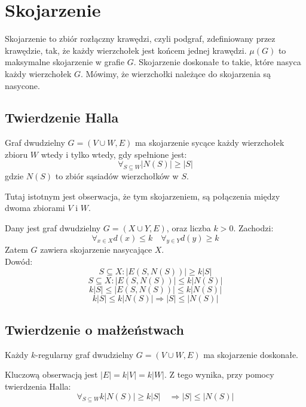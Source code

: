 \documentclass{../notatki}
\begin{document}
\section{Skojarzenie}

Skojarzenie to zbiór rozłączny krawędzi, czyli podgraf, zdefiniowany
przez krawędzie, tak, że każdy wierzchołek jest końcem jednej
krawędzi. $\mu(G)$ to maksymalne skojarzenie w grafie $G$.
Skojarzenie doskonałe to takie, które nasyca każdy wierzchołek $G$.
Mówimy, że wierzchołki należące do skojarzenia są nasycone.

\subsection{Twierdzenie Halla}

Graf dwudzielny $G = (V \cup W, E)$ ma skojarzenie sycące każdy wierzchołek
zbioru $W$ wtedy i tylko wtedy, gdy spełnione jest:
$$
\forall_{S \subseteq W} |N(S)| \geq |S|
$$
gdzie $N(S)$ to zbiór sąsiadów wierzchołków w $S$.

Tutaj istotnym jest obserwacja, że tym skojarzeniem, są połączenia między
dwoma zbiorami $V$ i $W$.

\begin{examplebox}
  Dany jest graf dwudzielny $G=(X \cup Y, E)$, oraz liczba $k > 0$. Zachodzi:
  $$
  \forall_{x \in X} d(x) \leq k \quad \forall_{y \in Y} d(y) \geq k
  $$
  Zatem $G$ zawiera skojarzenie nasycające $X$.
  \\
  Dowód:
  $$
  S \subseteq X : |E(S, N(S))| \geq k|S|
  $$
  $$
  S \subseteq X: |E(S, N(S))| \leq k|N(S)|
  $$
  $$
  k|S| \leq |E(S, N(S))| \leq k|N(S)|
  $$
  $$
  k|S| \leq k|N(S)| \Rightarrow |S| \leq |N(S)|
  $$

\end{examplebox}

\subsection{Twierdzenie o małżeństwach}

Każdy $k$-regularny graf dwudzielny $G = (V \cup W, E)$ ma
skojarzenie doskonałe.

Kluczową obserwacją jest $|E| = k |V| = k |W|$. Z tego wynika, przy pomocy
twierdzenia Halla:
$$
\forall_{S \subseteq W} k|N(S)| \geq k|S| \quad \Rightarrow |S| \leq |N(S)|
$$
\end{document}

